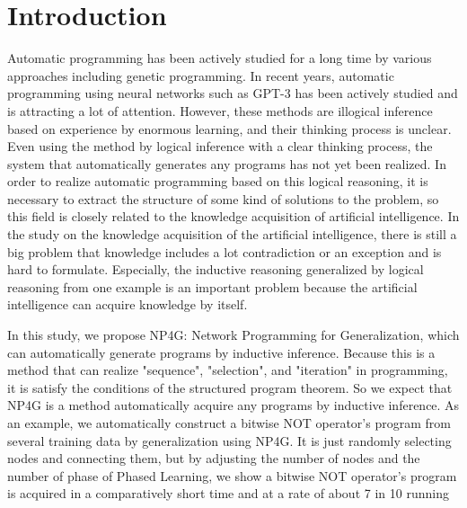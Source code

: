 \documentclass{article}
\begin{document}
\section{Introduction}
Automatic programming has been actively studied for a long time by various approaches including genetic programming.
In recent years, automatic programming using neural networks such as GPT-3\cite{gpt3} has been actively studied and is attracting a lot of attention.
However, these methods are illogical inference based on experience by enormous learning, and their thinking process is unclear.
Even using the method by logical inference with a clear thinking process, the system that automatically generates any programs has not yet been realized.
In order to realize automatic programming based on this logical reasoning, it is necessary to extract the structure of some kind of solutions to the problem, so this field is closely related to the knowledge acquisition of artificial intelligence.
In the study on the knowledge acquisition of the artificial intelligence, there is still a big problem that knowledge includes a lot contradiction or an exception and is hard to formulate.
Especially, the inductive reasoning generalized by logical reasoning from one example is an important problem because the artificial intelligence can acquire knowledge by itself.

In this study, we propose NP4G: Network Programming for Generalization, which can automatically generate programs by inductive inference.
Because this is a method that can realize "sequence", "selection", and "iteration" in programming, it is satisfy the conditions of the structured program theorem. So we expect that NP4G is a method automatically acquire any programs by inductive inference.
As an example, we automatically construct a bitwise NOT operator's program from several training data by generalization using NP4G.
It is just randomly selecting nodes and connecting them, but by adjusting the number of nodes and the number of phase of Phased Learning, we show a bitwise NOT operator's program is acquired in a comparatively short time and at a rate of about 7 in 10 running
\end{document}
